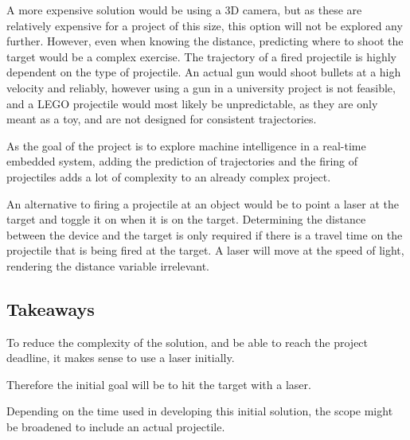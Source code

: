 A more expensive solution would be using a 3D camera, but as these are relatively expensive for a project of this size, this option will not be explored any further.
However, even when knowing the distance, predicting where to shoot the target would be a complex exercise.
The trajectory of a fired projectile is highly dependent on the type of projectile.
An actual gun would shoot bullets at a high velocity and reliably, however using a gun in a university project is not feasible, and a LEGO projectile would most likely be unpredictable, as they are only meant as a toy, and are not designed for consistent trajectories.


As the goal of the project is to explore machine intelligence in a real-time embedded system, adding the prediction of trajectories and the firing of projectiles adds a lot of complexity to an already complex project.

An alternative to firing a projectile at an object would be to point a laser at the target and toggle it on when it is on the target.
Determining the distance between the device and the target is only required if there is a travel time on the projectile that is being fired at the target.
A laser will move at the speed of light, rendering the distance variable irrelevant.


\subsection{Takeaways}\label{anal:laser:takeaway}
To reduce the complexity of the solution, and be able to reach the project deadline, it makes sense to use a laser initially. 

Therefore the initial goal will be to hit the target with a laser.

Depending on the time used in developing this initial solution, the scope might be broadened to include an actual projectile.
